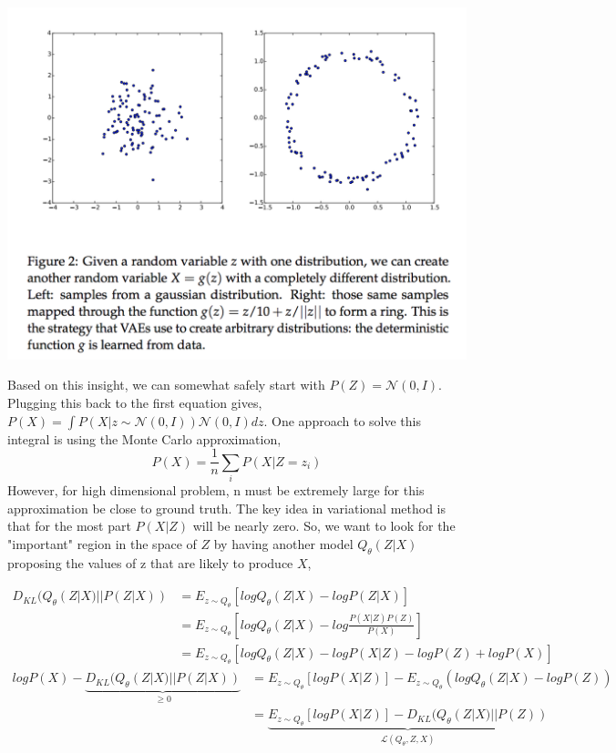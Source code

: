 \documentclass[graybox]{svmult}
\begin{document}
\includegraphics[width=\textwidth]{normal.png}

Based on this insight, we can somewhat safely start with $P(Z) = \mathcal{N}(0, I)$. Plugging this back to the first equation gives, $P(X) = \int P(X|z\sim\mathcal{N}(0, I))\mathcal{N}(0, I) dz$. One approach to solve this integral is using the Monte Carlo approximation,
\[
P(X) = \frac{1}{n}\sum_i P(X|Z=z_i)
\]
However, for high dimensional problem, n must be extremely large for this approximation be close to ground truth. The key idea in variational method is that for the most part $P(X|Z)$ will be nearly zero. So, we want to look for the "important" region in the space of $Z$ by having another model $Q_{\theta}(Z|X)$ proposing the values of z that are likely to produce $X$,

\[
\begin{aligned}
D_{KL}(Q_{\theta}(Z|X) || P(Z|X)) & = E_{z\sim Q_{\theta}}[logQ_{\theta}(Z|X) - logP(Z|X)] \\
                         & = E_{z\sim Q_{\theta}}[logQ_{\theta}(Z|X) - log\frac{P(X|Z)P(Z)}{P(X)}] \\
                         & = E_{z\sim Q_{\theta}}[logQ_{\theta}(Z|X) - logP(X|Z) - logP(Z) + logP(X)]
\end{aligned}
\]
\[
\begin{aligned}
logP(X) - \underbrace{D_{KL}(Q_{\theta}(Z|X) || P(Z|X))}_{\geq 0} & = E_{z\sim Q_{\theta}}[logP(X|Z)] - E_{z\sim Q_{\theta}}(logQ_{\theta}(Z|X) - logP(Z)) \\
& = \underbrace{E_{z\sim Q_{\theta}}[logP(X|Z)] - D_{KL}(Q_{\theta}(Z|X) || P(Z))}_{\mathcal{L}(Q_{\theta}, Z, X)}
\end{aligned}
\]
\end{document}
